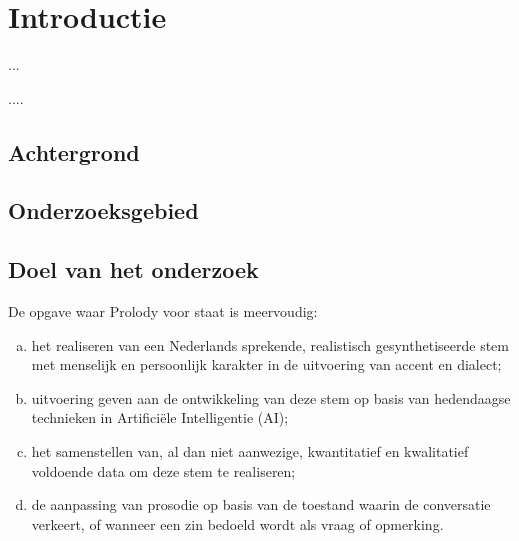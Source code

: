 \chapter{Introductie}

\begin{center}
  \begin{minipage}{0.5\textwidth}
    \begin{small}
      ...
    \end{small}
  \end{minipage}
  \vspace{0.5cm}
\end{center}

\noindent ....

\section{Achtergrond}


\section{Onderzoeksgebied}


\section{Doel van het onderzoek}

De opgave waar Prolody voor staat is meervoudig:
\begin{enumerate}[a)]
    \item het realiseren van een Nederlands sprekende, realistisch gesynthetiseerde stem met menselijk en persoonlijk karakter in de uitvoering van accent en dialect;
    \item uitvoering geven aan de ontwikkeling van deze stem op basis van hedendaagse technieken in Artificiële Intelligentie (AI);
    \item het samenstellen van, al dan niet aanwezige, kwantitatief en kwalitatief voldoende data om deze stem te realiseren;
    \item de aanpassing van prosodie op basis van de toestand waarin de conversatie verkeert, of wanneer een zin bedoeld wordt als vraag of opmerking.
\end{enumerate}

